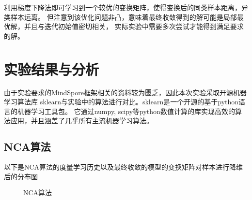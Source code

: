 \documentclass[notitlepage]{article}
\begin{document}
利用梯度下降法即可学习到一个较优的变换矩阵，使得变换后的同类样本距离，异类样本远离。
但注意到该优化问题非凸，意味着最终收敛得到的解可能是局部最优解，并且与迭代初始值密切相关，
实际实验中需要多次尝试才能得到满足要求的解。

\section{实验结果与分析}

由于实验要求的MindSpore框架相关的资料较为匮乏，因此本次实验采取开源机器学习算法库
sklearn与实验中的算法进行对比。sklearn是一个开源的基于python语言的机器学习工具包。
它通过numpy, scipy等python数值计算的库实现高效的算法应用，并且涵盖了几乎所有主流机器学习算法。

\subsection*{NCA算法}

以下是NCA算法的度量学习历史以及最终收敛的模型的变换矩阵对样本进行降维后的分布图

\newpage

\begin{figure}[htbp]
	\centering
	\hspace{3pt}
	\caption{NCA算法}
\end{figure}
\end{document}
